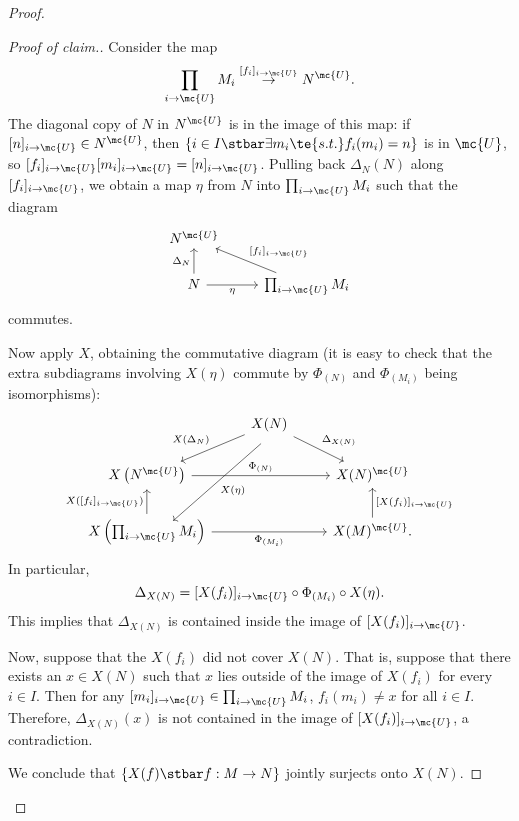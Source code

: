 \begin{proof}
\begin{description}
\begin{proof}[Proof of claim.]
        Consider the map
        $$\prod_{i \to \mc{U}} M_i \overset{[f_i]_{i \to \mc{U}}}{\to} N^{\mc{U}}.$$
        The diagonal copy of $N$ in $N^{\mc{U}}$ is in the image of this map: if $[n]_{i \to \mc{U}} \in N^{\mc{U}}$, then $\{i \in I \stbar \exists m_i \te{ s.t. } f_i(m_i) =  n\}$ is in $\mc{U}$, so $[f_i]_{i \to \mc{U}} [m_i]_{i \to \mc{U}} = [n]_{i \to \mc{U}}$. Pulling back $\Delta_N(N)$ along $[f_i]_{i \to \mc{U}}$, we obtain a map $\eta$ from $N$ into $\prod_{i \to \mc{U}} M_i$ such that the diagram
        $$
        \begin{tikzcd}[ampersand replacement = \&]
         N^{\mc{U}} \& \\
         N \arrow{u}{\Delta_N} \arrow[swap]{r}{\eta} \& \prod_{i \to \mc{U}} M_i \arrow[swap]{ul}{[f_i]_{i \to \mc{U}}}
          \end{tikzcd}
        $$
commutes.

Now apply $X$, obtaining the commutative diagram (it is easy to check that the extra subdiagrams involving $X(\eta)$ commute by $\Phi_{(N)}$ and $\Phi_{(M_i)}$ being isomorphisms):
$$
\begin{tikzcd}[ampersand replacement = \&]
  \& X(N) \arrow[swap]{dl}{X(\Delta_N)} \arrow{dr}{\Delta_{X(N)}} \arrow[shift left = 1.5ex]{ddl}{X(\eta)}\& \\
X\left(N^{\mc{U}}\right) \arrow{rr}{\Phi_{(N)}}  \& \& X(N)^{\mc{U}}\\
X\left(\prod_{i \to \mc{U}} M_i\right) \arrow{u}{X([f_i]_{i \to \mc{U}})} \arrow[swap]{rr}{\Phi_{(M_i)}}  \& \& X(M)^{\mc{U}}. \arrow[swap]{u}{[X(f_i)]_{i \to \mc{U}}}
  \end{tikzcd}
$$
In particular,
$$\Delta_{X(N)} = [X(f_i)]_{i \to \mc{U}} \circ \Phi_{(M_i)} \circ X(\eta).$$ This implies that $\Delta_{X(N)}$ is contained inside the image of $[X(f_i)]_{i \to \mc{U}}$.

Now, suppose that the $X(f_i)$ did not cover $X(N)$. That is, suppose that there exists an $x \in X(N)$ such that $x$ lies outside of the image of $X(f_i)$ for every $i \in I$. Then for any $[m_i]_{i \to \mc{U}} \in \prod_{i \to \mc{U}} M_i$, $f_i(m_i) \neq x$ for all $i \in I$. Therefore, $\Delta_{X(N)}(x)$ is not contained in the image of $[X(f_i)]_{i \to \mc{U}}$, a contradiction.

We conclude that $\{X(f) \stbar f : M \to N\}$ jointly surjects onto $X(N)$.
      \end{proof}
    \end{description}


\end{proof}
